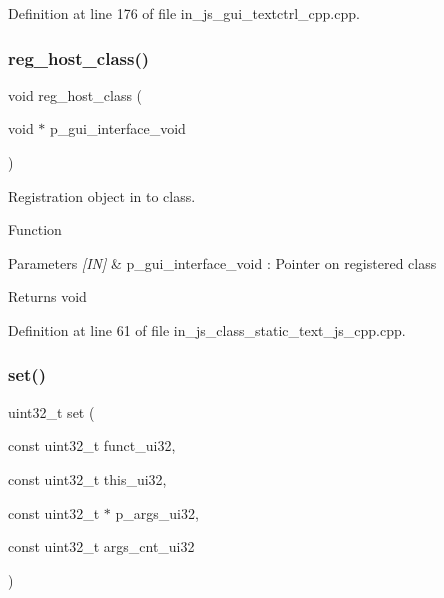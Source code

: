 Definition at line 176 of file in\+\_\+js\+\_\+gui\+\_\+textctrl\+\_\+cpp.\+cpp.

\mbox{\label{group___static__text_gac715b4a43bb361fc96ce6f1b50d68a8b}} 
\subsubsection{reg\_host\_class()}
{\footnotesize\ttfamily void reg\+\_\+host\+\_\+class (\begin{DoxyParamCaption}\item[{void $\ast$}]{p\+\_\+gui\+\_\+interface\+\_\+void }\end{DoxyParamCaption})}



Registration object in to class. 

Function
\begin{DoxyParams}{Parameters}
{\em \mbox{[}\+I\+N\mbox{]}} & p\+\_\+gui\+\_\+interface\+\_\+void \+: Pointer on registered class \\
\hline
\end{DoxyParams}
\begin{DoxyReturn}{Returns}
void 
\end{DoxyReturn}


Definition at line 61 of file in\+\_\+js\+\_\+class\+\_\+static\+\_\+text\+\_\+js\+\_\+cpp.\+cpp.

\mbox{\label{group___static__text_gaddd13ecddc86a2824924f6fd5a27cb74}} 
\subsubsection{set()}
{\footnotesize\ttfamily uint32\+\_\+t set (\begin{DoxyParamCaption}\item[{const uint32\+\_\+t}]{funct\+\_\+ui32,  }\item[{const uint32\+\_\+t}]{this\+\_\+ui32,  }\item[{const uint32\+\_\+t $\ast$}]{p\+\_\+args\+\_\+ui32,  }\item[{const uint32\+\_\+t}]{args\+\_\+cnt\+\_\+ui32 }\end{DoxyParamCaption})\hspace{0.3cm}{\ttfamily [static]}}



